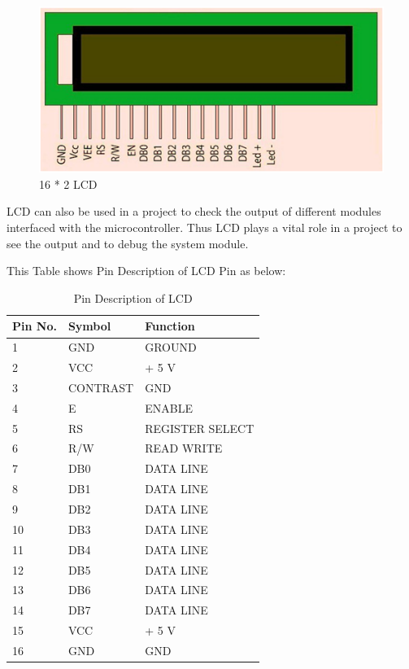 \documentclass[12pt,a4paper,oneside,openright]{report}
\begin{document}
\begin{figure}[!h]
 \centering
 \includegraphics[width = .90\textwidth]{Figures/7.jpg}
 \caption{16 * 2 LCD}
 \label{lcd}
\end{figure}
LCD can also be used in a project to check the output of different modules interfaced with the microcontroller. Thus LCD plays a vital role in a project to see the output and to debug the system module. 

This Table shows Pin Description of LCD Pin as below:

\begin{table}[!h]
\centering
\caption{Pin Description of LCD}
 \begin{tabular}{|l|l|l|} \hline
 \bf Pin No.	&\bf Symbol & \bf Function \\ \hline
1		&GND	&GROUND		\\	\hline
2		&VCC	&+ 5 V	\\ \hline
3		&CONTRAST &GND \\ \hline
4		&E	&ENABLE \\ \hline
5		&RS	&REGISTER SELECT \\ \hline
6		&R/W	&READ WRITE \\ \hline
7		&DB0	&DATA LINE \\ \hline
8		&DB1	&DATA LINE \\ \hline
9		&DB2	&DATA LINE \\ \hline
10		&DB3	&DATA LINE \\ \hline
11		&DB4	&DATA LINE \\ \hline
12		&DB5	&DATA LINE \\ \hline
13		&DB6	&DATA LINE \\ \hline
14		&DB7	&DATA LINE \\ \hline
15		&VCC	&+ 5 V \\ \hline
16		&GND	&GND \\ \hline
 \end{tabular}
\end{table}
\end{document}
